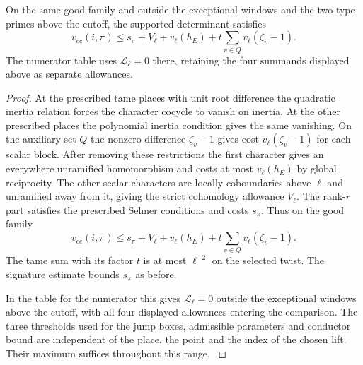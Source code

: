 \begin{lemma}
\label{lem:offwindow-global-budget}
On the same good family and outside the exceptional windows
and the two type primes above the cutoff, the supported determinant
satisfies
\[
       v_{cc}(i,\pi)\le s_\pi+V_\ell+v_\ell(h_E)
                           +t\sum_{v\in Q}v_\ell(\zeta_v-1).
\]
The numerator table uses \(\mathcal L_\ell=0\) there, retaining
the four summands displayed above as separate allowances.
\end{lemma}

\begin{proof}
At the prescribed tame places with unit root difference the
quadratic inertia relation forces the character cocycle to
vanish on inertia. At the other prescribed places the polynomial
inertia condition gives the same vanishing. On the auxiliary
set \(Q\) the nonzero difference \(\zeta_v-1\) gives cost
\(v_\ell(\zeta_v-1)\) for each scalar block. After removing
these restrictions the first character gives an everywhere
unramified homomorphism and costs at most \(v_\ell(h_E)\) by
global reciprocity. The other scalar characters are locally
coboundaries above \(\ell\) and unramified away from it, giving
the strict cohomology allowance \(V_\ell\). The rank-\(r\)
part satisfies the prescribed Selmer conditions and costs
\(s_\pi\). Thus on the good family
\[
 v_{cc}(i,\pi)\le s_\pi+V_\ell+v_\ell(h_E)
                   +t\sum_{v\in Q}v_\ell(\zeta_v-1).
\]
The tame sum with its factor \(t\) is at most \(\ell^{-2}\)
on the selected twist. The signature estimate bounds \(s_\pi\)
as before.

In the table for the numerator this gives
\(\mathcal L_\ell=0\) outside the exceptional windows above the
cutoff, with all four displayed allowances entering the comparison.
The three thresholds used for the jump boxes, admissible
parameters and conductor bound are independent of the place,
the point and the index of the chosen lift. Their maximum
suffices throughout this range. \label{cor:large-prime-length-8}
\end{proof}

